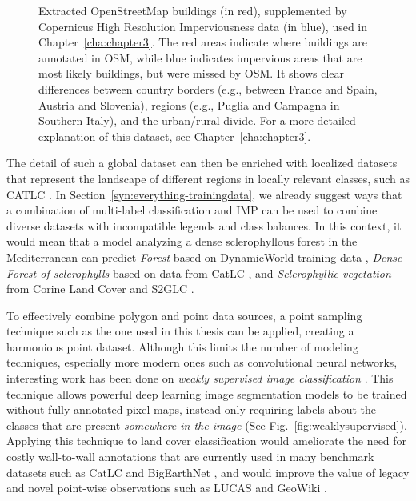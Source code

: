 \begin{figure}[H]
\begin{subfigure}[t]{0.48\textwidth}
                \end{subfigure}
                
                \caption{Extracted OpenStreetMap buildings (in red), supplemented by Copernicus High Resolution Imperviousness data (in blue), used in Chapter\@~\ref{cha:chapter3}. The red areas indicate where buildings are annotated in OSM, while blue indicates impervious areas that are most likely buildings, but were missed by OSM. It shows clear differences between country borders (e.g., between France and Spain, Austria and Slovenia), regions (e.g., Puglia and Campagna in Southern Italy), and the urban/rural divide. For a more detailed explanation of this dataset, see Chapter\@~\ref{cha:chapter3}.}
                \label{fig:osm_vs_cop_overall} %
            \end{figure}

            
            The detail of such a global dataset can then be enriched with localized datasets that represent the landscape of different regions in locally relevant classes, such as CATLC \citep{garcia2022catlc}. In Section\@~\ref{syn:everything-trainingdata}, we already suggest ways that a combination of multi-label classification and IMP can be used to combine diverse datasets with incompatible legends and class balances. In this context, it would mean that a model analyzing a dense sclerophyllous forest in the Mediterranean can predict \textit{Forest} based on DynamicWorld training data \citep{tait2021dwtd}, \textit{Dense Forest of sclerophylls} based on data from CatLC \citep{garcia2022catlc}, and \textit{Sclerophyllic vegetation} from Corine Land Cover and S2GLC \citep{jenerowicz2021validation}. 

            To effectively combine polygon and point data sources, a point sampling technique such as the one used in this thesis can be applied, creating a harmonious point dataset. Although this limits the number of modeling techniques, especially more modern ones such as convolutional neural networks, interesting work has been done on \textit{weakly supervised image classification} \citep{huang2018weaklysupervised}. This technique allows powerful deep learning image segmentation models to be trained without fully annotated pixel maps, instead only requiring labels about the classes that are present \textit{somewhere in the image} (See Fig.\@~\ref{fig:weaklysupervised}). Applying this technique to land cover classification would ameliorate the need for costly wall-to-wall annotations that are currently used in many benchmark datasets such as CatLC \citep{garcia2022catlc} and BigEarthNet \citep{sumbul2021bigearthnet}, and would improve the value of legacy and novel point-wise observations such as LUCAS \citep{dandrimont2021lucas} and GeoWiki \citep{fritz2012geo}.

